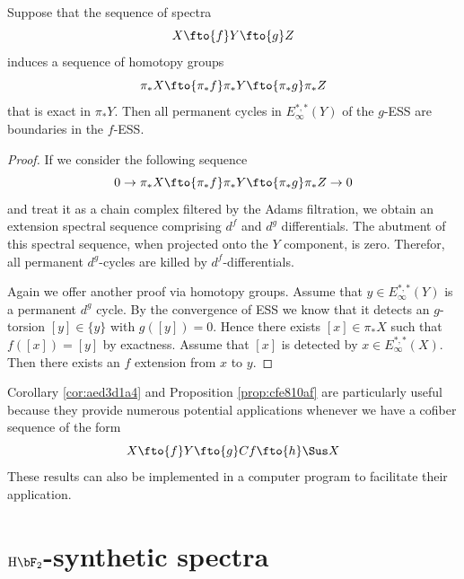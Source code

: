 \documentclass{amsart}
\numberwithin{equation}{section}
\newcommand{\HF}{\mathrm{H}\bF_2}
\begin{document}
\begin{proposition}\label{prop:cfe810af}
    Suppose that the sequence of spectra
    $$X\fto{f}Y\fto{g}Z$$
    induces a sequence of homotopy groups
    $$\pi_*X\fto{\pi_*f}\pi_*Y\fto{\pi_*g}\pi_*Z$$
    that is exact in $\pi_*Y$. Then all permanent cycles in $E^{*,*}_\infty(Y)$ of the $g$-ESS are boundaries in the $f$-ESS.
\end{proposition}

\begin{proof}
    If we consider the following sequence
    \begin{equation}\label{eq:8c7eec14}
        0\to \pi_*X\fto{\pi_*f}\pi_*Y\fto{\pi_*g}\pi_*Z\to 0
    \end{equation}
    and treat it as a chain complex filtered by the Adams filtration, we obtain an extension spectral sequence comprising $d^f$ and $d^g$ differentials. The abutment of this spectral sequence, when projected onto the $Y$ component, is zero. Therefor, all permanent $d^g$-cycles are killed by $d^f$-differentials.

    Again we offer another proof via homotopy groups. Assume that $y\in E^{*,*}_\infty(Y)$ is a permanent $d^g$ cycle. By the convergence of ESS we know that it detects an $g$-torsion $[y]\in \{y\}$ with $g([y])=0$. Hence there exists $[x]\in \pi_*X$ such that $f([x])=[y]$ by exactness. Assume that $[x]$ is detected by $x\in E^{*,*}_\infty(X)$. Then there exists an $f$ extension from $x$ to $y$.
\end{proof}

Corollary \ref{cor:aed3d1a4} and Proposition \ref{prop:cfe810af} are particularly useful because they provide numerous potential applications whenever we have a cofiber sequence of the form
$$X\fto{f}Y\fto{g}Cf\fto{h}\Sus X$$
These results can also be implemented in a computer program to facilitate their application.

\section{$\HF$-synthetic spectra} \label{sec:synthetic}
\end{document}
